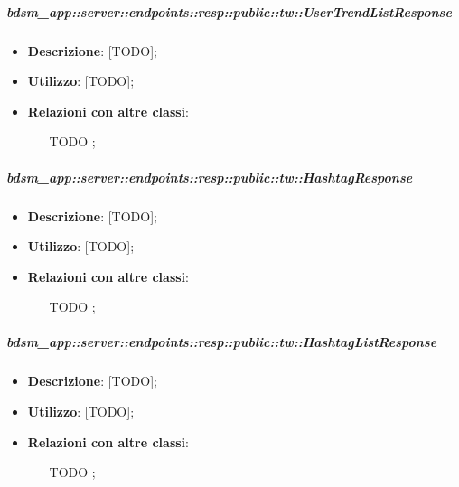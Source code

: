     \subparagraph{bdsm\_app::server::endpoints::resp::public::tw::UserTrendListResponse} %
    \label{subp:bdsm_app_server_endpoints_resp_public_tw_usertrendlistresponse}
    \begin{itemize}
      \item \textbf{Descrizione}: [TODO];
      \item \textbf{Utilizzo}: [TODO];
      \item \textbf{Relazioni con altre classi}:
        \begin{itemize}
          \item [TODO];
        \end{itemize}
      \end{itemize}
    
    \subparagraph{bdsm\_app::server::endpoints::resp::public::tw::HashtagResponse} %
    \label{subp:bdsm_app_server_endpoints_resp_public_tw_hashtagresponse}
    \begin{itemize}
      \item \textbf{Descrizione}: [TODO];
      \item \textbf{Utilizzo}: [TODO];
      \item \textbf{Relazioni con altre classi}:
        \begin{itemize}
          \item [TODO];
        \end{itemize}
      \end{itemize}
    
    \subparagraph{bdsm\_app::server::endpoints::resp::public::tw::HashtagListResponse} %
    \label{subp:bdsm_app_server_endpoints_resp_public_tw_hashtaglistresponse}
    \begin{itemize}
      \item \textbf{Descrizione}: [TODO];
      \item \textbf{Utilizzo}: [TODO];
      \item \textbf{Relazioni con altre classi}:
        \begin{itemize}
          \item [TODO];
        \end{itemize}
      \end{itemize}
    
